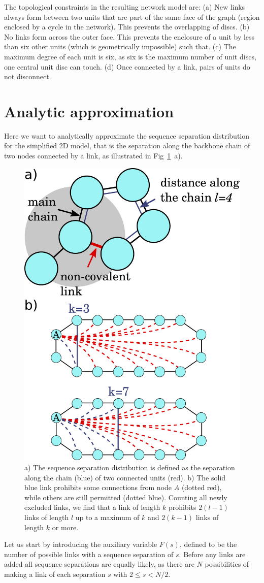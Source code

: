 \documentclass[reprint,amsmath,amssymb,rmp,onecolumn,notitlepage,11pt]{revtex4-1}
\begin{document}
The topological constraints in the resulting network model are:
(a) New links always form between two units that are part of the same face of the graph (region enclosed by a cycle in the network). This prevents the overlapping of discs. (b) No links form across the outer face. This prevents the enclosure of a unit by less than six other units (which is geometrically impossible) such that. (c) The maximum degree of each unit is six, as six is the maximum number of unit discs, one central unit disc can touch. (d) Once connected by a link, pairs of units do not disconnect.

\section*{Analytic approximation}
Here we want to analytically approximate the sequence separation distribution for the simplified 2D model, that is the separation along the backbone chain of two nodes connected by a link, as illustrated in Fig~\ref{fig:schematic}~a).

\begin{figure}[h]
    \centering
    \includegraphics[width=0.4\columnwidth]{figures/Fig1.pdf}
    \caption{a) The sequence separation distribution is defined as the separation along the chain (blue) of two connected units (red). b) The solid blue link prohibits some connections from node $A$ (dotted red), while others are still permitted (dotted blue). Counting all newly excluded links, we find that a link of length $k$ prohibits $2(l-1)$ links of length $l$ up to a maximum of $k$ and $2(k-1)$ links of length $k$ or more.}
    \label{fig:schematic}
\end{figure}

Let us start by introducing the auxiliary variable $F(s)$, defined to be the number of possible links with a sequence separation of $s$. Before any links are added all sequence separations are equally likely, as there are $N$ possibilities of making a link of each separation $s$ with $2\leq s < N/2$.
\end{document}
